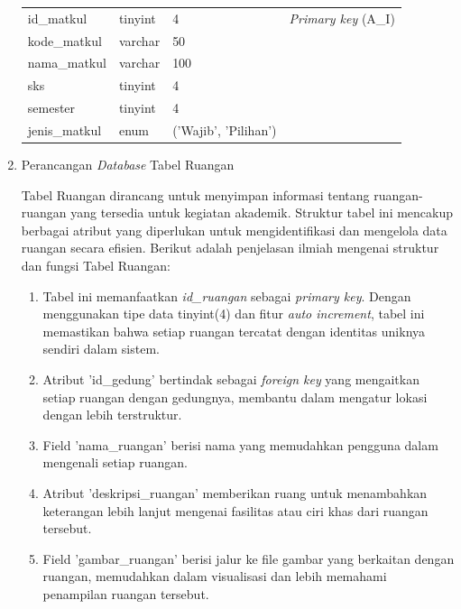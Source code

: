 \begin{enumerate}
{\begin{longtable}{l l l l}
				      id\_matkul              & tinyint                & 4                        & \textit{Primary key} (A\_I) \\
				      kode\_matkul            & varchar                & 50                       &                             \\
				      nama\_matkul            & varchar                & 100                      &                             \\
				      sks                     & tinyint                & 4                        &                             \\
				      semester                & tinyint                & 4                        &                             \\
				      jenis\_matkul           & enum                   & ('Wajib', 'Pilihan')     &                             \\
				      \hline
			      \end{longtable}
		      }

	\item Perancangan \textit{Database} Tabel Ruangan

	      Tabel Ruangan dirancang untuk menyimpan informasi tentang ruangan-ruangan yang tersedia untuk kegiatan akademik. Struktur tabel ini mencakup berbagai atribut yang diperlukan untuk mengidentifikasi dan mengelola data ruangan secara efisien. Berikut adalah penjelasan ilmiah mengenai struktur dan fungsi Tabel Ruangan:

	      \begin{enumerate}[label=\alph*.]
		      \item Tabel ini memanfaatkan \textit{id\_ruangan} sebagai \textit{primary key}. Dengan menggunakan tipe data tinyint(4) dan fitur \textit{auto increment}, tabel ini memastikan bahwa setiap ruangan tercatat dengan identitas uniknya sendiri dalam sistem.
		      \item Atribut 'id\_gedung' bertindak sebagai \textit{foreign key} yang mengaitkan setiap ruangan dengan gedungnya, membantu dalam mengatur lokasi dengan lebih terstruktur.
		      \item Field 'nama\_ruangan' berisi nama yang memudahkan pengguna dalam mengenali setiap ruangan.
		      \item Atribut 'deskripsi\_ruangan' memberikan ruang untuk menambahkan keterangan lebih lanjut mengenai fasilitas atau ciri khas dari ruangan tersebut.
		      \item Field 'gambar\_ruangan' berisi jalur ke file gambar yang berkaitan dengan ruangan, memudahkan dalam visualisasi dan lebih memahami penampilan ruangan tersebut.
	      \end{enumerate}


\end{enumerate}
